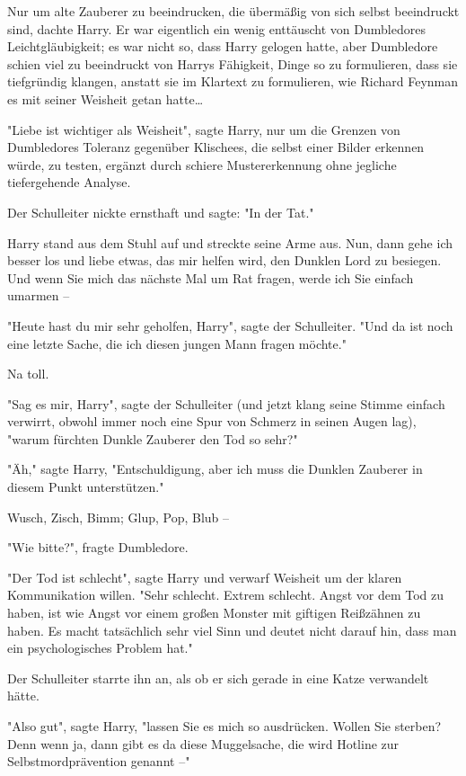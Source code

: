 {Nur um alte Zauberer zu beeindrucken, die übermäßig von sich selbst beeindruckt sind, dachte Harry. Er war eigentlich ein wenig enttäuscht von Dumbledores Leichtgläubigkeit; es war nicht so, dass Harry gelogen hatte, aber Dumbledore schien viel zu beeindruckt von Harrys Fähigkeit, Dinge so zu formulieren, dass sie tiefgründig klangen, anstatt sie im Klartext zu formulieren, wie Richard Feynman es mit seiner Weisheit getan hatte…

"Liebe ist wichtiger als Weisheit", sagte Harry, nur um die Grenzen von Dumbledores Toleranz gegenüber Klischees, die selbst einer Bilder erkennen würde, zu testen, ergänzt durch schiere Mustererkennung ohne jegliche tiefergehende Analyse.

Der Schulleiter nickte ernsthaft und sagte: "In der Tat."

Harry stand aus dem Stuhl auf und streckte seine Arme aus. Nun, dann gehe ich besser los und liebe etwas, das mir helfen wird, den Dunklen Lord zu besiegen. Und wenn Sie mich das nächste Mal um Rat fragen, werde ich Sie einfach umarmen --

"Heute hast du mir sehr geholfen, Harry", sagte der Schulleiter. "Und da ist noch eine letzte Sache, die ich diesen jungen Mann fragen möchte."

Na toll.

"Sag es mir, Harry", sagte der Schulleiter (und jetzt klang seine Stimme einfach verwirrt, obwohl immer noch eine Spur von Schmerz in seinen Augen lag), "warum fürchten Dunkle Zauberer den Tod so sehr?"

"Äh," sagte Harry, "Entschuldigung, aber ich muss die Dunklen Zauberer in diesem Punkt unterstützen."

Wusch, Zisch, Bimm; Glup, Pop, Blub --

"Wie bitte?", fragte Dumbledore.

"Der Tod ist schlecht", sagte Harry und verwarf Weisheit um der klaren Kommunikation willen. "Sehr schlecht. Extrem schlecht. Angst vor dem Tod zu haben, ist wie Angst vor einem großen Monster mit giftigen Reißzähnen zu haben. Es macht tatsächlich sehr viel Sinn und deutet nicht darauf hin, dass man ein psychologisches Problem hat."

Der Schulleiter starrte ihn an, als ob er sich gerade in eine Katze verwandelt hätte.

"Also gut", sagte Harry, "lassen Sie es mich so ausdrücken. Wollen Sie sterben? Denn wenn ja, dann gibt es da diese Muggelsache, die wird Hotline zur Selbstmordprävention genannt --"

}
